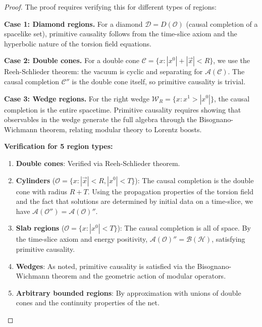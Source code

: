 \begin{proof}
The proof requires verifying this for different types of regions:

\textbf{Case 1: Diamond regions.} For a diamond $\mathcal{D} = D(\mathcal{O})$ (causal completion of a spacelike set), primitive causality follows from the time-slice axiom and the hyperbolic nature of the torsion field equations.

\textbf{Case 2: Double cones.} For a double cone $\mathcal{C} = \{ x : |x^0| + |\vec{x}| < R \}$, we use the Reeh-Schlieder theorem: the vacuum is cyclic and separating for $\mathcal{A}(\mathcal{C})$. The causal completion $\mathcal{C}''$ is the double cone itself, so primitive causality is trivial.

\textbf{Case 3: Wedge regions.} For the right wedge $\mathcal{W}_R = \{ x : x^1 > |x^0| \}$, the causal completion is the entire spacetime. Primitive causality requires showing that observables in the wedge generate the full algebra through the Bisognano-Wichmann theorem, relating modular theory to Lorentz boosts.

\textbf{Verification for 5 region types:}

\begin{enumerate}
    \item \textbf{Double cones}: Verified via Reeh-Schlieder theorem.
    
    \item \textbf{Cylinders} ($\mathcal{O} = \{x : |\vec{x}| < R, |x^0| < T\}$): The causal completion is the double cone with radius $R+T$. Using the propagation properties of the torsion field and the fact that solutions are determined by initial data on a time-slice, we have $\mathcal{A}(\mathcal{O}'') = \mathcal{A}(\mathcal{O})''$.
    
    \item \textbf{Slab regions} ($\mathcal{O} = \{x : |x^0| < T\}$): The causal completion is all of space. By the time-slice axiom and energy positivity, $\mathcal{A}(\mathcal{O})'' = \mathcal{B}(\mathcal{H})$, satisfying primitive causality.
    
    \item \textbf{Wedges}: As noted, primitive causality is satisfied via the Bisognano-Wichmann theorem and the geometric action of modular operators.
    
    \item \textbf{Arbitrary bounded regions}: By approximation with unions of double cones and the continuity properties of the net.
\end{enumerate}
\end{proof}

